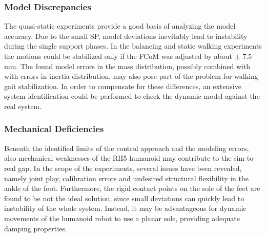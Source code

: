 \subsubsection{Model Discrepancies}
The quasi-static experiments provide a good basis of analyzing the model accuracy. Due to the small \gls{SP}, model deviations inevitably lead to instability during the single support phases. In the balancing and static walking experiments the motions could be stabilized only if the \gls{FCoM} was adjusted by about $\pm$ 7.5 mm. The found model errors in the mass distribution, possibly combined with with errors in inertia distribution, may also pose part of the problem for walking gait stabilization. In order to compensate for these differences, an extensive system identification could be performed to check the dynamic model against the real system.
\subsubsection{Mechanical Deficiencies}
Beneath the identified limits of the control approach and the modeling errors, also mechanical weaknesses of the RH5 humanoid may contribute to the sim-to-real gap. In the scope of the experiments, several issues have been revealed, namely joint play, calibration errors and undesired structural flexibility in the ankle of the foot. Furthermore, the rigid contact points on the sole of the feet are found to be not the ideal solution, since small deviations can quickly lead to instability of the whole system. Instead, it may be advantageous for dynamic movements of the humanoid robot to use a planar sole, providing adequate damping properties. 


























